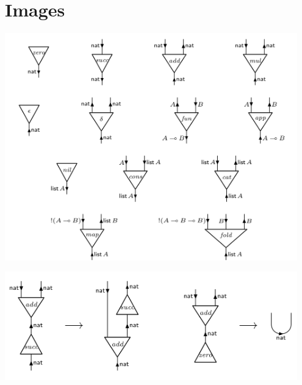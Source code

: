 \documentclass{fit-teorsem}
\begin{document}
\maketsheader
\thispagestyle{empty}

\section*{Images}
\begin{minipage}{.5\textwidth}
	\includegraphics[width=0.95\textwidth]{inet-nodes}
	\label{fig:inet-nodes}
\end{minipage} %
\begin{minipage}{.5\textwidth}
	\includegraphics[width=0.95\textwidth]{inet-addition}
	\label{fig:inet-addition}
\end{minipage}
\end{document}
